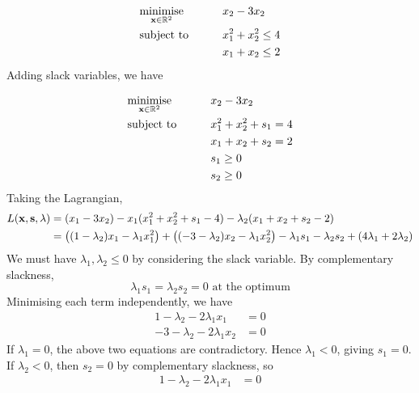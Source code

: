 \begin{example}
	\begin{alignat*}{2}
		 & \underset{\vb x \in \mathbb R^2}{\text{minimise}} & \qquad & x_2 - 3x_2           \\
		 & \text{subject to}                                 &        & x_1^2 + x_2^2 \leq 4 \\
		 &                                                   &        & x_1 + x_2 \leq 2
	\end{alignat*}
	Adding slack variables, we have

	\begin{alignat*}{2}
		 & \underset{\vb x \in \mathbb R^2}{\text{minimise}} & \qquad & x_2 - 3x_2              \\
		 & \text{subject to}                                 &        & x_1^2 + x_2^2 + s_1 = 4 \\
		 &                                                   &        & x_1 + x_2 + s_2 = 2     \\
		 &                                                   &        & s_1 \geq 0              \\
		 &                                                   &        & s_2 \geq 0
	\end{alignat*}
	Taking the Lagrangian,
	\begin{align*}
		L(\vb x, \vb s, \vb \lambda) & = (x_1 - 3x_2) - x_1(x_1^2 + x_2^2 + s_1 - 4) - \lambda_2(x_1 + x_2 + s_2 - 2)                                                                       \\
		                             & = \qty((1 - \lambda_2)x_1 - \lambda_1 x_1^2) + \qty((-3-\lambda_2)x_2 - \lambda_1 x_2^2) - \lambda_1 s_1 - \lambda_2 s_2 + (4\lambda_1 + 2\lambda_2)
	\end{align*}
	We must have \(\lambda_1, \lambda_2 \leq 0\) by considering the slack variable.
	By complementary slackness,
	\[
		\lambda_1 s_1 = \lambda_2 s_2 = 0 \text{ at the optimum}
	\]
	Minimising each term independently, we have
	\begin{align*}
		1 - \lambda_2 - 2\lambda_1 x_1 & = 0 \\
		-3-\lambda_2 - 2\lambda_1 x_2  & = 0
	\end{align*}
	If \(\lambda_1 = 0\), the above two equations are contradictory.
	Hence \(\lambda_1 < 0\), giving \(s_1 = 0\).
	If \(\lambda_2 < 0\), then \(s_2 = 0\) by complementary slackness, so
	\begin{align*}
		1 - \lambda_2 - 2\lambda_1 x_1 & = 0 \\

\end{align*}
\end{example}
